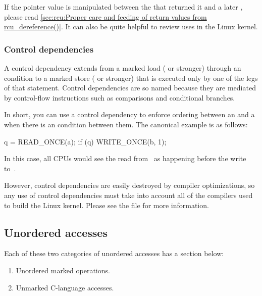 If the pointer value is manipulated between the 
that returned it and a later , please read
\cref{sec:rcu:Proper care and feeding of return values from rcu_dereference()}.
It can also be quite helpful to review uses in the Linux kernel.


\subsubsection{Control dependencies}

A control dependency extends from a marked load ( or stronger)
through an  condition to a marked store ( or stronger)
that is executed only by one of the legs of that  statement.
Control dependencies are so named because they are mediated by
control-flow instructions such as comparisons and conditional branches.

In short, you can use a control dependency to enforce ordering between
an  and a  when there is an  condition
between them.
The canonical example is as follows:

\begin{VerbatimU}
	q = READ_ONCE(a);
	if (q)
		WRITE_ONCE(b, 1);
\end{VerbatimU}

In this case, all CPUs would see the read from~ as happening before
the write to~.

However, control dependencies are easily destroyed by compiler
optimizations, so any use of control dependencies must take into account
all of the compilers used to build the Linux kernel.
Please see the
\hyperref[sec:docs:Control dependencies]{}
file for more information.


\subsection{Unordered accesses}
\label{sec:docs:ordering:Unordered accesses}

Each of these two categories of unordered accesses has a section below:

\begin{enumerate}
 \item	Unordered marked operations.

 \item	Unmarked C-language accesses.
\end{enumerate}


